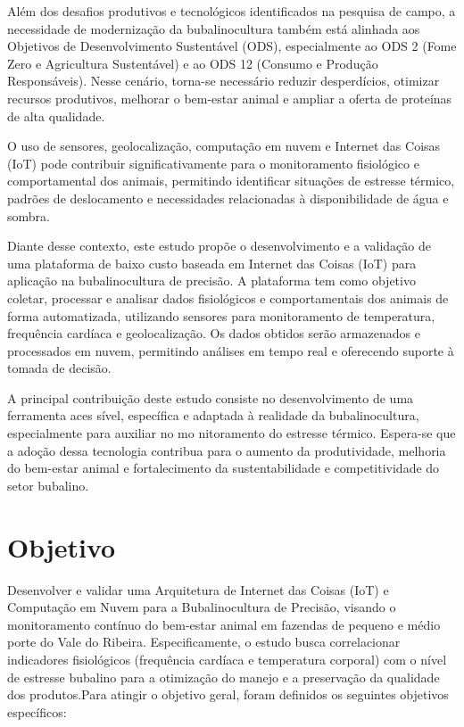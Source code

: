 \documentclass[11pt,a4paper]{article}
\begin{document}
Além dos desafios produtivos e tecnológicos identificados na pesquisa de campo, a necessidade
de modernização da bubalinocultura também está alinhada aos Objetivos de Desenvolvimento
Sustentável (ODS), especialmente ao ODS 2 (Fome Zero e Agricultura Sustentável) e ao ODS
12 (Consumo e Produção Responsáveis). Nesse cenário, torna-se necessário reduzir desperdícios,
otimizar recursos produtivos, melhorar o bem-estar animal e ampliar a oferta de proteínas de
alta qualidade.

O uso de sensores, geolocalização, computação em nuvem e Internet das Coisas (IoT) pode
contribuir significativamente para o monitoramento fisiológico e comportamental dos animais,
permitindo identificar situações de estresse térmico, padrões de deslocamento e necessidades
relacionadas à disponibilidade de água e sombra.

Diante desse contexto, este estudo propõe o desenvolvimento e a validação de uma plataforma
de baixo custo baseada em Internet das Coisas (IoT) para aplicação na bubalinocultura de
precisão. A plataforma tem como objetivo coletar, processar e analisar dados fisiológicos e
comportamentais dos animais de forma automatizada, utilizando sensores para monitoramento
de temperatura, frequência cardíaca e geolocalização. Os dados obtidos serão armazenados e
processados em nuvem, permitindo análises em tempo real e oferecendo suporte à tomada de
decisão.

A principal contribuição deste estudo consiste no desenvolvimento de uma ferramenta aces
sível, específica e adaptada à realidade da bubalinocultura, especialmente para auxiliar no mo
nitoramento do estresse térmico. Espera-se que a adoção dessa tecnologia contribua para o
aumento da produtividade, melhoria do bem-estar animal e fortalecimento da sustentabilidade
e competitividade do setor bubalino.

\section{Objetivo}

Desenvolver e validar uma Arquitetura de Internet das Coisas (IoT) e Computação em Nuvem
para a Bubalinocultura de Precisão, visando o monitoramento contínuo do bem-estar animal
em fazendas de pequeno e médio porte do Vale do Ribeira. Especificamente, o estudo busca
correlacionar indicadores fisiológicos (frequência cardíaca e temperatura corporal) com o nível de
estresse bubalino para a otimização do manejo e a preservação da qualidade dos produtos.Para
atingir o objetivo geral, foram definidos os seguintes objetivos específicos:
\end{document}
